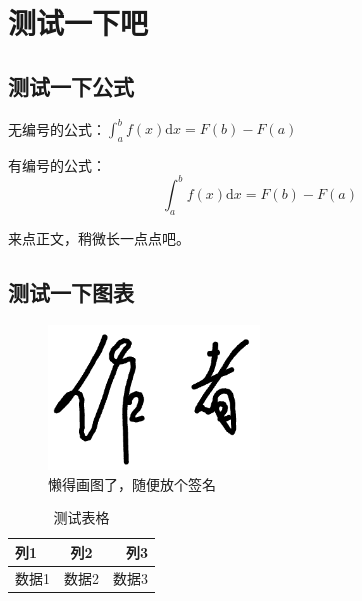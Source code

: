 
\section{测试一下吧}

\subsection{测试一下公式}

无编号的公式：$\int_a^b f(x)\mathrm{d}x=F(b)-F(a)$

有编号的公式：
\begin{equation}
    \int_a^b f(x)\mathrm{d}x=F(b)-F(a)
\end{equation}


来点正文，稍微长一点点吧。

\subsection{测试一下图表}

\begin{figure}[htbp]
    \centering
    \includegraphics[width=0.5\textwidth]{signatures/author.png}
    \caption{懒得画图了，随便放个签名}
    \label{fig:example}
\end{figure}

\begin{table}[htbp]
    \centering
    \caption{测试表格}
    \begin{tabularx}{0.8\linewidth}{|L|C|R|}
        \hline
        列1  & 列2  & 列3  \\
        \hline
        数据1 & 数据2 & 数据3 \\
        \hline
    \end{tabularx}
    \label{tab:example}
\end{table}

